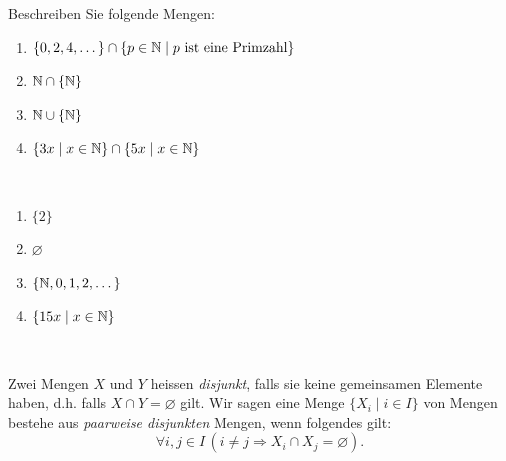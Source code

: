 \begin{ueb}
    Beschreiben Sie folgende Mengen:
    \begin{enumerate}
        \item $\{0,2,4,\dots \}\cap \{p\in\mathbb{N}\mid p\text{ ist eine Primzahl} \}$
        \item $\mathbb{N}\cap\{\mathbb{N}\}$
        \item $\mathbb{N}\cup\{\mathbb{N}\}$
        \item $\{3x\mid x\in\mathbb{N} \} \cap \{5x\mid x\in\mathbb{N} \}$
    \end{enumerate}
    \begin{lsg}
        {~
            \begin{enumerate}
                \item $\{2\}$
                \item $\varnothing$
                \item $\{\mathbb{N},0,1,2,\dots \}$
                \item $\{15x\mid x\in\mathbb{N} \}$
            \end{enumerate}
        }{~
            \answerspace{3cm}}
    \end{lsg}
\end{ueb}

\begin{df}
 Zwei Mengen $X$ und $Y$ heissen \textit{disjunkt}, falls sie keine gemeinsamen Elemente haben, d.h. falls $X\cap Y=\varnothing$ gilt. Wir sagen eine Menge $\{X_i\mid i\in I \}$ von Mengen bestehe aus \textit{paarweise disjunkten} Mengen, wenn folgendes gilt:
 \[
 \forall i,j\in I\,(i\neq j\Rightarrow X_i\cap X_j=\varnothing).
 \]
\end{df}

